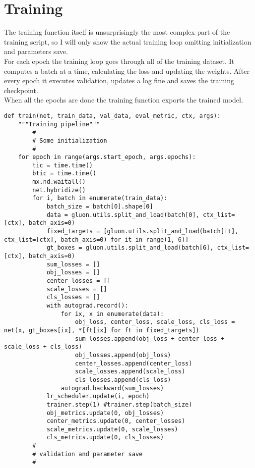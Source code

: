 \section{Training}
The training function itself is unsurprisingly the most complex part of the training script, so I will only show the actual training loop omitting initialization and parameters save. \\
For each epoch the training loop goes through all of the training dataset. It computes a batch at a time, calculating the loss and updating the weights. After every epoch it executes validation, updates a log fine and saves the training checkpoint. \\
When all the epochs are done the training function exports the trained model.

\begin{lstlisting}
def train(net, train_data, val_data, eval_metric, ctx, args):
    """Training pipeline"""
		#
		# Some initialization
		#
    for epoch in range(args.start_epoch, args.epochs):
        tic = time.time()
        btic = time.time()
        mx.nd.waitall()
        net.hybridize()
        for i, batch in enumerate(train_data):
            batch_size = batch[0].shape[0]
            data = gluon.utils.split_and_load(batch[0], ctx_list=[ctx], batch_axis=0)
            fixed_targets = [gluon.utils.split_and_load(batch[it], ctx_list=[ctx], batch_axis=0) for it in range(1, 6)]
            gt_boxes = gluon.utils.split_and_load(batch[6], ctx_list=[ctx], batch_axis=0)
            sum_losses = []
            obj_losses = []
            center_losses = []
            scale_losses = []
            cls_losses = []
            with autograd.record():
                for ix, x in enumerate(data):
                    obj_loss, center_loss, scale_loss, cls_loss = net(x, gt_boxes[ix], *[ft[ix] for ft in fixed_targets])
                    sum_losses.append(obj_loss + center_loss + scale_loss + cls_loss)
                    obj_losses.append(obj_loss)
                    center_losses.append(center_loss)
                    scale_losses.append(scale_loss)
                    cls_losses.append(cls_loss)
                autograd.backward(sum_losses)
            lr_scheduler.update(i, epoch)
            trainer.step(1) #trainer.step(batch_size)
            obj_metrics.update(0, obj_losses)
            center_metrics.update(0, center_losses)
            scale_metrics.update(0, scale_losses)
            cls_metrics.update(0, cls_losses)
        #
        # validation and parameter save
        #
\end{lstlisting}





